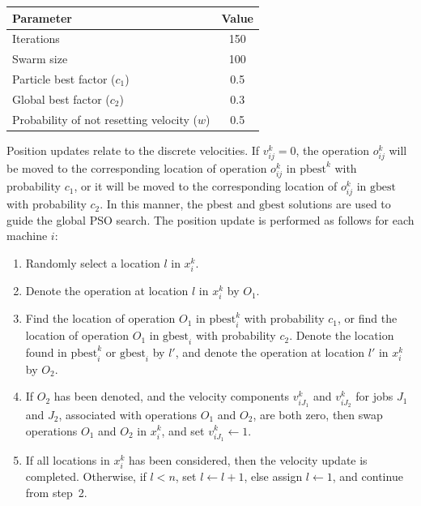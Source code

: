 \documentclass[paper=a4, fontsize=9pt]{scrartcl}
\begin{document}
\begin{multicols}{2}
{
\vspace{0.2cm}
\begin{minipage}{\linewidth{}}
\centering
\begin{tabular}{lc}
\toprule
Parameter                                   & Value \\
\midrule
Iterations                                  & 150   \\
Swarm size                                  & 100   \\
Particle best factor ($c_1$)                &   0.5 \\
Global best factor ($c_2$)                  &   0.3 \\
Probability of not resetting velocity ($w$) &   0.5 \\
\bottomrule
\end{tabular}
\label{table:psoparams}
\end{minipage}
}

Position updates relate to the discrete velocities. If $v_{ij}^k=0$, the operation $o_{ij}^k$ will be moved to the corresponding location of operation $o_{ij}^k$ in $\text{pbest}^k$ with probability $c_1$, or it will be moved to the corresponding location of $o_{ij}^k$ in $\text{gbest}$ with probability $c_2$. In this manner, the $\text{pbest}$ and $\text{gbest}$ solutions are used to guide the global \ac{PSO} search. The position update is performed as follows for each machine $i$:

\begin{enumerate}
    \item Randomly select a location $l$ in $x_i^k$.
    \item Denote the operation at location $l$ in $x_i^k$ by $O_1$.
    \item Find the location of operation $O_1$ in $\text{pbest}_i^k$ with probability $c_1$, or find the location of operation $O_1$ in $\text{gbest}_i$ with probability $c_2$. Denote the location found in $\text{pbest}_i^k$ or $\text{gbest}_i$ by $l'$, and denote the operation at location $l'$ in $x_i^k$ by $O_2$.
    \item If $O_2$ has been denoted, and the velocity components $v_{i{J_1}}^k$ and $v_{i{J_2}}^k$ for jobs $J_1$ and $J_2$, associated with operations $O_1$ and $O_2$, are both zero, then swap operations $O_1$ and $O_2$ in $x_i^k$, and set $v_{i{J_1}}^k \gets 1$.
    \item If all locations in $x_i^k$ has been considered, then the velocity update is completed. Otherwise, if $l<n$, set $l \gets l+1$, else assign $l \gets 1$, and continue from step~2.
\end{enumerate}


\end{multicols}
\end{document}
